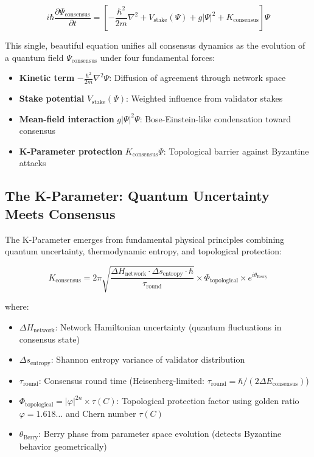\documentclass[11pt,a4paper]{article}
\begin{document}
\begin{tcolorbox}[colback=resonancered!10,colframe=resonancered,title=\textbf{The Dirac-Approved Master Equation}]
\begin{equation}
\boxed{i\hbar\frac{\partial\Psi_{\text{consensus}}}{\partial t} = \left[-\frac{\hbar^2}{2m}\nabla^2 + V_{\text{stake}}(\Psi) + g|\Psi|^2 + K_{\text{consensus}}\right]\Psi}
\label{eq:master-consensus}
\end{equation}

This single, beautiful equation unifies all consensus dynamics as the evolution of a quantum field $\Psi_{\text{consensus}}$ under four fundamental forces:
\begin{itemize}
    \item \textbf{Kinetic term} $-\frac{\hbar^2}{2m}\nabla^2\Psi$: Diffusion of agreement through network space
    \item \textbf{Stake potential} $V_{\text{stake}}(\Psi)$: Weighted influence from validator stakes
    \item \textbf{Mean-field interaction} $g|\Psi|^2\Psi$: Bose-Einstein-like condensation toward consensus
    \item \textbf{K-Parameter protection} $K_{\text{consensus}}\Psi$: Topological barrier against Byzantine attacks
\end{itemize}
\end{tcolorbox}

\subsection{The K-Parameter: Quantum Uncertainty Meets Consensus}

The K-Parameter emerges from fundamental physical principles combining quantum uncertainty, thermodynamic entropy, and topological protection:

\begin{equation}
K_{\text{consensus}} = 2\pi\sqrt{\frac{\Delta H_{\text{network}} \cdot \Delta s_{\text{entropy}} \cdot \hbar}{\tau_{\text{round}}}} \times \Phi_{\text{topological}} \times e^{i\theta_{\text{Berry}}}
\label{eq:k-parameter}
\end{equation}

where:

\begin{itemize}
    \item $\Delta H_{\text{network}}$: Network Hamiltonian uncertainty (quantum fluctuations in consensus state)
    \item $\Delta s_{\text{entropy}}$: Shannon entropy variance of validator distribution
    \item $\tau_{\text{round}}$: Consensus round time (Heisenberg-limited: $\tau_{\text{round}} = \hbar/(2\Delta E_{\text{consensus}})$)
    \item $\Phi_{\text{topological}} = |\varphi|^{2n} \times \tau(C)$: Topological protection factor using golden ratio $\varphi = 1.618\ldots$ and Chern number $\tau(C)$
    \item $\theta_{\text{Berry}}$: Berry phase from parameter space evolution (detects Byzantine behavior geometrically)
\end{itemize}
\end{document}
